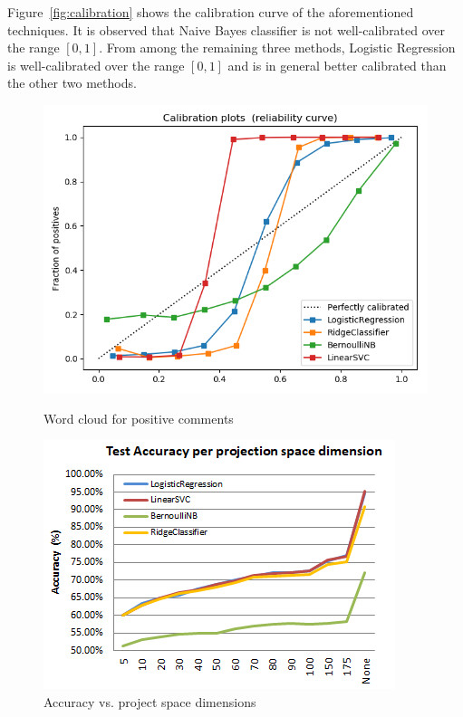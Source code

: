 Figure~\ref{fig:calibration} shows the calibration curve of the aforementioned techniques. It is observed that Naive Bayes classifier is not well-calibrated over the range $[0,1]$. From among the remaining three methods, Logistic Regression is well-calibrated over the range $[0,1]$ and is in general better calibrated than the other two methods.
\begin{figure}[h]
\centering
\begin{minipage}{0.49\textwidth}
\centering
\includegraphics[width=1.0\linewidth]{figures/calibration.png}
\caption{Word cloud for positive comments}
\label{fig:calibration}
\end{minipage}
\begin{minipage}{0.49\textwidth}
\centering
\includegraphics[width=1.0\linewidth]{figures/dim_reduction_accuracy.png}
\caption{Accuracy vs. project space dimensions}
\label{fig:dim-reduction}
\end{minipage}
\end{figure}
